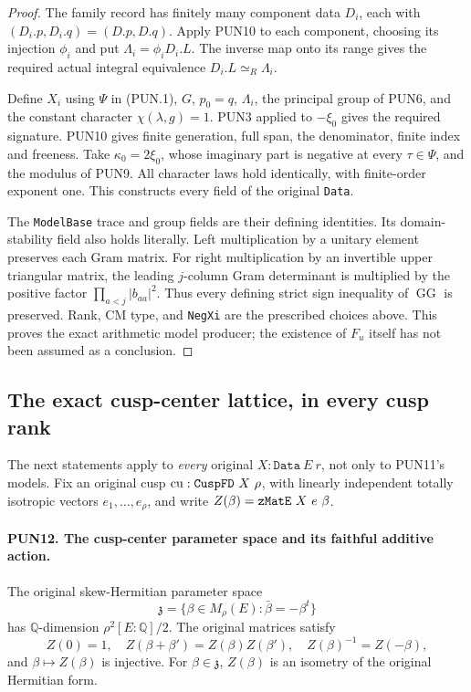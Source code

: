 \documentclass[11pt,a4paper]{article}
\numberwithin{equation}{section}
\theoremstyle{remark}\newtheorem{remark}[theorem]{Remark}
\begin{document}
\begin{proof}
The family record has finitely many component data \(D_i\),
each with \((D_i.p,D_i.q)=(D.p,D.q)\).  Apply PUN10 to each
component, choosing its injection \(\phi_i\) and put
\(\Lambda_i=\phi_iD_i.L\).  The inverse map onto its range
gives the required actual integral equivalence
\(D_i.L\simeq_R\Lambda_i\).

Define \(X_i\) using \(\Psi\) in (PUN.1), \(G\),
\(p_0=q\), \(\Lambda_i\), the principal group of PUN6, and
the constant character \(\chi(\lambda,g)=1\).  PUN3 applied
to \(-\xi_0\) gives the required signature.  PUN10 gives
finite generation, full span, the denominator, finite index and
freeness.  Take \(\kappa_0=2\xi_0\), whose imaginary part is
negative at every \(\tau\in\Psi\), and the modulus of PUN9.
All character laws hold identically, with finite-order exponent
one.  This constructs every field of the original \texttt{Data}.

The \texttt{Model\allowbreak Base} trace and group fields are their defining
identities.  Its domain-stability field also holds literally.
Left multiplication by a unitary element preserves each Gram
matrix.  For right multiplication by an invertible upper
triangular matrix, the leading \(j\)-column Gram determinant
is multiplied by the positive factor
\(\prod_{a<j}|b_{aa}|^2\).  Thus every defining strict sign
inequality of \(\operatorname{GG}\) is preserved.  Rank,
CM type, and \texttt{Neg\allowbreak Xi} are the prescribed choices above.
This proves the exact arithmetic model producer; the existence
of \(F_u\) itself has not been assumed as a conclusion.
\end{proof}

\subsection{The exact cusp-center lattice, in every cusp rank}

The next statements apply to \emph{every} original
\(X:\texttt{Data}\ E\ r\), not only to PUN11's models.
Fix an original cusp \(\mathrm{cu}:\texttt{Cusp\allowbreak FD}\ X\ \rho\),
with linearly independent totally isotropic vectors
\(e_1,\ldots,e_\rho\), and write
\(Z(\beta)=\texttt{z\allowbreak Mat\allowbreak E}\ X\ e\ \beta\).

\paragraph{PUN12. The cusp-center parameter space and its faithful additive action.}
\label{claim:PUN12}
The original skew-Hermitian parameter space
\[
 \mathfrak z=\{\beta\in M_\rho(E):\bar\beta=-\beta^t\}
 \tag{PUN.11}
\]
has \(\mathbb Q\)-dimension \(\rho^2[E:\mathbb Q]/2\).
The original matrices satisfy
\[
 Z(0)=1,\quad Z(\beta+\beta')=Z(\beta)Z(\beta'),\quad
 Z(\beta)^{-1}=Z(-\beta),
 \tag{PUN.12}
\]
and \(\beta\mapsto Z(\beta)\) is injective.
For \(\beta\in\mathfrak z\), \(Z(\beta)\) is an isometry
of the original Hermitian form.
\end{document}
